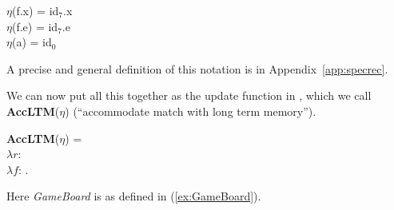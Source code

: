 \begin{ex}
\begin{subex}
\item  $\eta$(f.x) = id$_7$.x\\
       $\eta$(f.e) = id$_7$.e\\
       $\eta$(a) = id$_0$

\item {} 
 
\end{subex} 
   
\end{ex} 
A precise and general definition of this notation is in Appendix~\ref{app:specrec}.   


 
We can now put all this together as the update function in \nexteg{},
which we call \textbf{AccLTM}($\eta$) (``accommodate match with long term memory'').
\begin{ex}
\textbf{AccLTM}($\eta$) =\\ 
$\lambda r$:\\
\hspace*{1em}$\lambda
f$:  . \\
\hspace*{2em} 
\label{ex:AccLTM}
\end{ex}
\label{pg:inverserelabelling} 
Here \textit{GameBoard} is as defined in (\ref{ex:GameBoard}).
     
